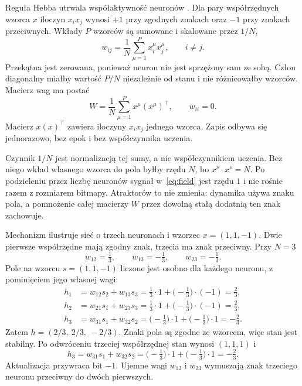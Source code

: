 \documentclass[11pt,a4paper]{article}
\begin{document}
Reguła Hebba utrwala współaktywność neuronów \cite{hebb1949}. Dla pary współrzędnych wzorca \(x\) iloczyn \(x_i x_j\) wynosi \(+1\) przy zgodnych znakach oraz \(-1\) przy znakach przeciwnych. Wkłady \(P\) wzorców są sumowane i skalowane przez \(1/N\),
\[
    w_{ij} = \frac{1}{N}\sum_{\mu=1}^{P} x_i^{\mu} x_j^{\mu}, \qquad i \neq j.
\]
Przekątna jest zerowana, ponieważ neuron nie jest sprzężony sam ze sobą. Człon diagonalny miałby wartość \(P/N\) niezależnie od stanu i nie różnicowałby wzorców. Macierz wag ma postać
\begin{equation}
\label{eq:hebb}
    W = \frac{1}{N}\sum_{\mu=1}^{P} x^{\mu}(x^{\mu})^{\top}, \qquad w_{ii} = 0.
\end{equation}
Macierz \(x(x)^{\top}\) zawiera iloczyny \(x_i x_j\) jednego wzorca. Zapis odbywa się jednorazowo, bez epok i bez współczynnika uczenia.

Czynnik \(1/N\) jest normalizacją tej sumy, a nie współczynnikiem uczenia. Bez niego wkład własnego wzorca do pola byłby rzędu \(N\), bo \(x^{\nu}\cdot x^{\nu} = N\). Po podzieleniu przez liczbę neuronów sygnał w~\eqref{eq:field} jest rzędu \(1\) i nie rośnie razem z rozmiarem bitmapy. Atraktorów to nie zmienia: dynamika używa znaku pola, a pomnożenie całej macierzy \(W\) przez dowolną stałą dodatnią ten znak zachowuje.

Mechanizm ilustruje sieć o trzech neuronach i wzorzec \(x = (1, 1, -1)\). Dwie pierwsze współrzędne mają zgodny znak, trzecia ma znak przeciwny. Przy \(N = 3\)
\[
    w_{12} = \tfrac13, \qquad w_{13} = -\tfrac13, \qquad w_{23} = -\tfrac13.
\]
Pole na wzorcu \(s = (1, 1, -1)\) liczone jest osobno dla każdego neuronu, z pominięciem jego własnej wagi:
\begin{align*}
    h_1 &= w_{12}s_2 + w_{13}s_3 = \tfrac13\cdot 1 + \bigl(-\tfrac13\bigr)\cdot(-1) = \tfrac23, \\
    h_2 &= w_{21}s_1 + w_{23}s_3 = \tfrac13\cdot 1 + \bigl(-\tfrac13\bigr)\cdot(-1) = \tfrac23, \\
    h_3 &= w_{31}s_1 + w_{32}s_2 = \bigl(-\tfrac13\bigr)\cdot 1 + \bigl(-\tfrac13\bigr)\cdot 1 = -\tfrac23.
\end{align*}
Zatem \(h = (2/3,\ 2/3,\ -2/3)\). Znaki pola są zgodne ze wzorcem, więc stan jest stabilny. Po odwróceniu trzeciej współrzędnej stan wynosi \((1, 1, 1)\) i
\[
    h_3 = w_{31}s_1 + w_{32}s_2 = \bigl(-\tfrac13\bigr)\cdot 1 + \bigl(-\tfrac13\bigr)\cdot 1 = -\tfrac23.
\]
Aktualizacja przywraca bit \(-1\). Ujemne wagi \(w_{13}\) i \(w_{23}\) wymuszają znak trzeciego neuronu przeciwny do dwóch pierwszych.
\end{document}
